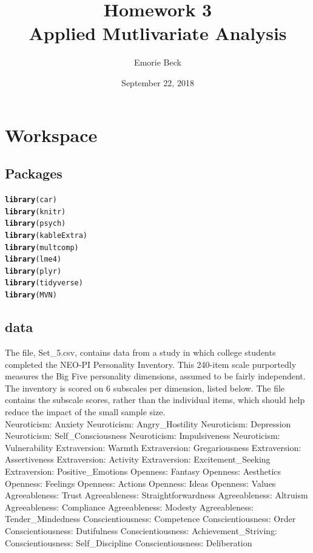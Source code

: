 \documentclass{article}\usepackage[]{graphicx}\usepackage[]{color}
\title{%
Homework 3\\
\large Applied Mutlivariate Analysis}
\date{September 22, 2018}
\author{Emorie Beck}
\makeatletter
\newcommand{\hlstd}[1]{\textcolor[rgb]{0.345,0.345,0.345}{#1}}%
\newcommand{\hlkwd}[1]{\textcolor[rgb]{0.737,0.353,0.396}{\textbf{#1}}}%
\newenvironment{kframe}{%
 \def\at@end@of@kframe{}%
 \ifinner\ifhmode%
  \def\at@end@of@kframe{\end{minipage}}%
  \begin{minipage}{\columnwidth}%
 \fi\fi%
 \def\FrameCommand##1{\hskip\@totalleftmargin \hskip-\fboxsep
 \colorbox{shadecolor}{##1}\hskip-\fboxsep
     \hskip-\linewidth \hskip-\@totalleftmargin \hskip\columnwidth}%
 \MakeFramed {\advance\hsize-\width
   \@totalleftmargin\z@ \linewidth\hsize
   \@setminipage}}%
 {\par\unskip\endMakeFramed%
 \at@end@of@kframe}
\newenvironment{knitrout}{}{} %
\makeatother
\begin{document}
\maketitle

\section{Workspace}
\subsection{Packages}



\begin{knitrout}
\color{fgcolor}\begin{kframe}
\begin{alltt}
\hlkwd{library}\hlstd{(car)}
\hlkwd{library}\hlstd{(knitr)}
\hlkwd{library}\hlstd{(psych)}
\hlkwd{library}\hlstd{(kableExtra)}
\hlkwd{library}\hlstd{(multcomp)}
\hlkwd{library}\hlstd{(lme4)}
\hlkwd{library}\hlstd{(plyr)}
\hlkwd{library}\hlstd{(tidyverse)}
\hlkwd{library}\hlstd{(MVN)}
\end{alltt}
\end{kframe}
\end{knitrout}



\subsection{data}
The file, Set\_5.csv, contains data from a study in which college students completed the NEO-PI Personality Inventory. This 240-item scale purportedly measures the Big Five personality dimensions, assumed to be fairly independent. The inventory is scored on 6 subscales per dimension, listed below. The file contains the subscale scores, rather than the individual items, which should help reduce the impact of the small sample size.\\

Neuroticism: Anxiety
Neuroticism: Angry\_Hostility
Neuroticism: Depression
Neuroticism: Self\_Consciousness
Neuroticism: Impulsiveness
Neuroticism: Vulnerability
Extraversion: Warmth
Extraversion: Gregariousness
Extraversion: Assertiveness
Extraversion: Activity
Extraversion: Excitement\_Seeking
Extraversion: Positive\_Emotions
Openness: Fantasy
Openness: Aesthetics
Openness: Feelings
Openness: Actions
Openness: Ideas
Openness: Values
Agreeableness: Trust
Agreeableness: Straightforwardness 
Agreeableness: Altruism
Agreeableness: Compliance
Agreeableness: Modesty
Agreeableness: Tender\_Mindedness
Conscientiousness: Competence
Conscientiousness: Order
Conscientiousness: Dutifulness
Conscientiousness: Achievement\_Striving: 
Conscientiousness: Self\_Discipline
Conscientiousness: Deliberation
\end{document}
